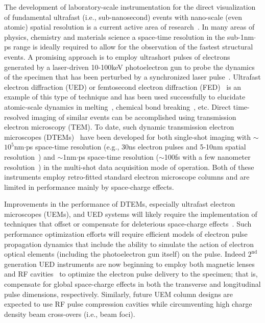 The development of laboratory-scale instrumentation for the direct visualization of fundamental ultrafast (i.e., sub-nanosecond) events with nano-scale (even atomic) spatial resolution is a current active area of research~\cite{king_ultrafast_2005}.
In many areas of physics, chemistry and materials science a space-time resolution in the sub-1nm$\cdot$ps range is ideally required to allow for the observation of the fastest structural events.
A promising approach is to employ ultrashort pulses of electrons generated by a laser-driven 10-100keV photoelectron gun to probe the dynamics of the specimen that has been perturbed by a synchronized laser pulse~\cite{king_ultrafast_2005}.
Ultrafast electron diffraction (UED) or femtosecond electron diffraction (FED)~\cite{srinivasan_ultrafast_2003,williamson_clocking_1997,cao_femtosecond_2003} is an example of this type of technique and has been used successfully to elucidate atomic-scale dynamics in melting~\cite{cao_femtosecond_2003,sciaini_electronic_2009,siwick_atomic-level_2003}, chemical bond breaking~\cite{zewail_laser_1988}, etc.
Direct time-resolved imaging of similar events can be accomplished using transmission electron microscopy (TEM).
To date, such dynamic transmission electron microscopes (DTEMs)~\cite{bostanjoglo_tracing_1980,domer_high-speed_2003} have been developed for both single-shot imaging with $\sim$$10^{5}$nm$\cdot$ps space-time resolution (e.g., 30ns electron pulses and 5-10nm spatial resolution~\cite{lagrange_single-shot_2006,armstrong_practical_2007}) and $\sim$1nm$\cdot$ps space-time resolution ($\sim$100fs with a few nanometer resolution~\cite{park_direct_2009}) in the multi-shot data acquisition mode of operation.
Both of these instruments employ retro-fitted standard electron microscope columns and are limited in performance mainly by space-charge effects.

Improvements in the performance of DTEMs, especially ultrafast electron microscopes (UEMs), and UED systems will likely require the implementation of techniques that offset or compensate for deleterious space-charge effects~\cite{armstrong_prospects_2007,lobastov_four-dimensional_2005}.
Such performance optimization efforts will require efficient models of electron pulse propagation dynamics that include the ability to simulate the action of electron optical elements (including the photoelectron gun itself) on the pulse.
Indeed $2^{\text{nd}}$ generation UED instruments are now beginning to employ both magnetic lenses and RF cavities~\cite{oudheusden_electron_2007,veisz_hybrid_2007} to optimize the electron pulse delivery to the specimen; that is, compensate for global space-charge effects in both the transverse and longitudinal pulse dimensions, respectively.
Similarly, future UEM column designs are expected to use RF pulse compression cavities while circumventing high charge density beam cross-overs (i.e., beam foci).

